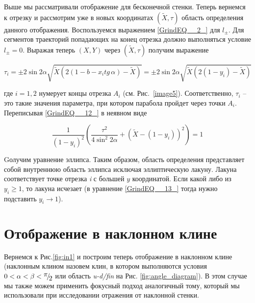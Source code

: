 \documentclass[a4paper]{article}
\begin{document}
 Выше мы рассматривали отображение для бесконечной стенки. Теперь вернемся к отрезку и рассмотрим уже в новых координатах $\left(\tilde{X},\tau \right)$ область определения данного отображения. Воспользуемся выражением \eqref{GrindEQ__2_} для $l_{\pm } $. Для сегментов траекторий попадающих на конец отрезка должно выполняться условие $l_{\pm } =0$. Выражая теперь $\left(X,Y\right)$ через $\left(\tilde{X},\tau \right)$ получим выражение

\begin{equation} \label{GrindEQ__12_} \tau _{i} =\pm 2\sin 2\alpha \sqrt{\tilde{X}\left(2\left(1-b-x_{i} tg\, \alpha \right)-\tilde{X}\right)} =\pm 2\sin 2\alpha \sqrt{\tilde{X}\left(2\left(1-y_{i} \right)-\tilde{X}\right)}  \end{equation}

где $i=1,2$ нумерует концы отрезка $A_{i} $ (см. Рис.~\ref{image5}). Соответственно, $\tau _{i} $ -- это такие значения параметра, при котором парабола пройдет через точки $A_{i} $. Переписывая \eqref{GrindEQ__12_} в неявном виде

\begin{equation} \label{GrindEQ__13_} \frac{1}{\left(1-y_{i} \right)^{2} } \left(\frac{\tau ^{2} }{4\sin ^{2} 2\alpha } +\left(\tilde{X}-\left(1-y_{i} \right)\right)^{2} \right)=1 \end{equation}

Gолучим уравнение эллипса. 
Таким образом, область определения представляет собой внутреннюю область эллипса исключая эллиптическую лакуну. Лакуна соответствует точке отрезка \textit{i} с большей $y$ координатой. Если какой либо из $y_{i} \ge 1$, то лакуна исчезает (в уравнение \eqref{GrindEQ__13_} тогда нужно подставить $y_{i} \to 1$).

\section{ Отображение в наклонном клине}

Вернемся к Рис.\ref{fig:in1} и построим теперь отображение в наклонном клине (наклонным клином назовем клин, в котором выполняются условия $0<\alpha <\beta <{\raise0.7ex\hbox{$ \pi  $}\!\mathord{\left/ {\vphantom {\pi  2}} \right. \kern-\nulldelimiterspace}\!\lower0.7ex\hbox{$ 2 $}} $ или область \textit{u-d/fin} на Рис. \ref{fig:angle_diagram}). В этом случае мы также можем применить фокусный подход аналогичный тому, который мы использовали при исследовании отражения от наклонной стенки.
\end{document}
